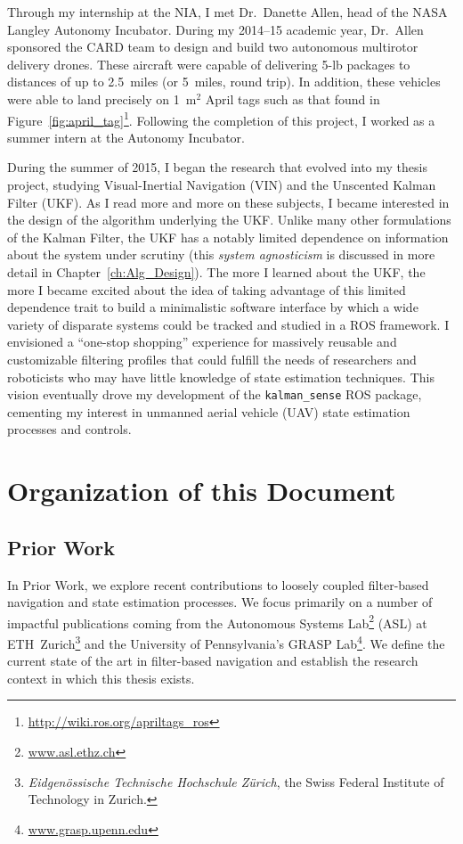 Through my internship at the NIA, I met Dr.~Danette Allen, head of the NASA Langley Autonomy Incubator. During my 2014--15 academic year, Dr.~Allen sponsored the CARD team to design and build two autonomous multirotor delivery drones. These aircraft were capable of delivering 5\nobreakdash-lb packages to distances of up to 2.5~miles (or 5~miles, round trip). In addition, these vehicles were able to land precisely on 1~m$^2$ April tags such as that found in Figure~\ref{fig:april_tag}\footnote{\url{http://wiki.ros.org/apriltags\_ros}}. Following the completion of this project, I worked as a summer intern at the Autonomy Incubator.

During the summer of 2015, I began the research that evolved into my thesis project, studying Visual-Inertial Navigation (VIN) and the Unscented Kalman Filter (UKF). As I read more and more on these subjects, I became interested in the design of the algorithm underlying the UKF. Unlike many other formulations of the Kalman Filter, the UKF has a notably limited dependence on information about the system under scrutiny (this \textit{system agnosticism} is discussed in more detail in Chapter~\ref{ch:Alg_Design}). The more I learned about the UKF, the more I became excited about the idea of taking advantage of this limited dependence trait to build a minimalistic software interface by which a wide variety of disparate systems could be tracked and studied in a ROS framework. I envisioned a ``one-stop shopping'' experience for massively reusable and customizable filtering profiles that could fulfill the needs of researchers and roboticists who may have little knowledge of state estimation techniques. This vision eventually drove my development of the \texttt{kalman\_sense} ROS package, cementing my interest in unmanned aerial vehicle (UAV) state estimation processes and controls.


\section{Organization of this Document}

\subsection*{Prior Work}

In Prior Work, we explore recent contributions to loosely coupled filter-based navigation and state estimation processes. We focus primarily on a number of impactful publications coming from the Autonomous Systems Lab\footnote{\url{www.asl.ethz.ch}} (ASL) at ETH~Zurich\footnote{\textit{Eidgen{\"o}ssische Technische Hochschule Z{\"u}rich}, the Swiss Federal Institute of Technology in Zurich.} and the University of Pennsylvania's GRASP Lab\footnote{\url{www.grasp.upenn.edu}}. We define the current state of the art in filter-based navigation and establish the research context in which this thesis exists.

